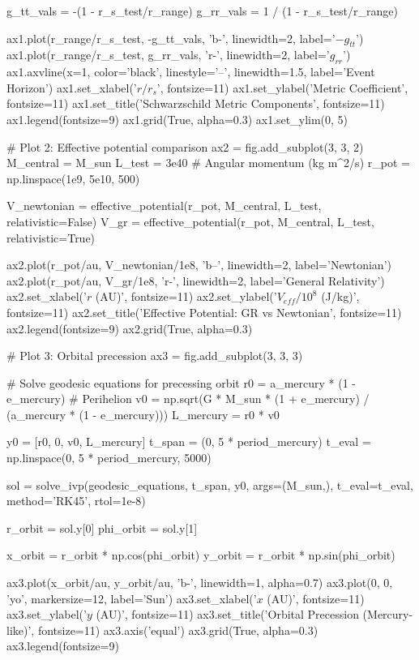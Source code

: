\documentclass[a4paper, 11pt]{article}
\begin{document}
\begin{pycode}
g_tt_vals = -(1 - r_s_test/r_range)
g_rr_vals = 1 / (1 - r_s_test/r_range)

ax1.plot(r_range/r_s_test, -g_tt_vals, 'b-', linewidth=2, label='$-g_{tt}$')
ax1.plot(r_range/r_s_test, g_rr_vals, 'r-', linewidth=2, label='$g_{rr}$')
ax1.axvline(x=1, color='black', linestyle='--', linewidth=1.5, label='Event Horizon')
ax1.set_xlabel('$r/r_s$', fontsize=11)
ax1.set_ylabel('Metric Coefficient', fontsize=11)
ax1.set_title('Schwarzschild Metric Components', fontsize=11)
ax1.legend(fontsize=9)
ax1.grid(True, alpha=0.3)
ax1.set_ylim(0, 5)

# Plot 2: Effective potential comparison
ax2 = fig.add_subplot(3, 3, 2)
M_central = M_sun
L_test = 3e40  # Angular momentum (kg m^2/s)
r_pot = np.linspace(1e9, 5e10, 500)

V_newtonian = effective_potential(r_pot, M_central, L_test, relativistic=False)
V_gr = effective_potential(r_pot, M_central, L_test, relativistic=True)

ax2.plot(r_pot/au, V_newtonian/1e8, 'b--', linewidth=2, label='Newtonian')
ax2.plot(r_pot/au, V_gr/1e8, 'r-', linewidth=2, label='General Relativity')
ax2.set_xlabel('$r$ (AU)', fontsize=11)
ax2.set_ylabel('$V_{eff}/10^8$ (J/kg)', fontsize=11)
ax2.set_title('Effective Potential: GR vs Newtonian', fontsize=11)
ax2.legend(fontsize=9)
ax2.grid(True, alpha=0.3)

# Plot 3: Orbital precession
ax3 = fig.add_subplot(3, 3, 3)

# Solve geodesic equations for precessing orbit
r0 = a_mercury * (1 - e_mercury)  # Perihelion
v0 = np.sqrt(G * M_sun * (1 + e_mercury) / (a_mercury * (1 - e_mercury)))
L_mercury = r0 * v0

y0 = [r0, 0, v0, L_mercury]
t_span = (0, 5 * period_mercury)
t_eval = np.linspace(0, 5 * period_mercury, 5000)

sol = solve_ivp(geodesic_equations, t_span, y0, args=(M_sun,),
                t_eval=t_eval, method='RK45', rtol=1e-8)

r_orbit = sol.y[0]
phi_orbit = sol.y[1]

x_orbit = r_orbit * np.cos(phi_orbit)
y_orbit = r_orbit * np.sin(phi_orbit)

ax3.plot(x_orbit/au, y_orbit/au, 'b-', linewidth=1, alpha=0.7)
ax3.plot(0, 0, 'yo', markersize=12, label='Sun')
ax3.set_xlabel('$x$ (AU)', fontsize=11)
ax3.set_ylabel('$y$ (AU)', fontsize=11)
ax3.set_title('Orbital Precession (Mercury-like)', fontsize=11)
ax3.axis('equal')
ax3.grid(True, alpha=0.3)
ax3.legend(fontsize=9)


\end{pycode}
\end{document}
